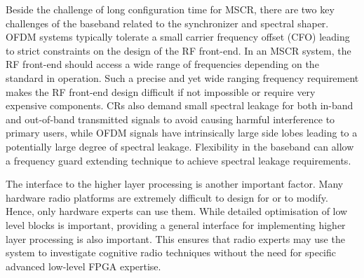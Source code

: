 Beside the challenge of long configuration time for MSCR, there are two key challenges of the baseband related to the synchronizer and spectral shaper. OFDM systems typically tolerate a small carrier frequency offset (CFO) leading to strict constraints on the design of the RF front-end. In an MSCR system, the RF front-end should access a wide range of frequencies depending on the standard in operation. Such a precise and yet wide ranging frequency requirement makes the RF front-end design difficult if not impossible or require very expensive components.
CRs also demand small spectral leakage for both in-band and out-of-band transmitted signals to avoid causing harmful interference to primary users, while OFDM signals have intrinsically large side lobes leading to a potentially large degree of spectral leakage. 
Flexibility in the baseband can allow a frequency guard extending technique to achieve spectral leakage requirements.

The interface to the higher layer processing is another important factor. Many hardware radio platforms are extremely difficult to design for or to modify. Hence, only hardware experts can use them. While detailed optimisation of low level blocks is important, providing a general interface for implementing higher layer processing is also important. This ensures that radio experts may use the system to investigate cognitive radio techniques without the need for specific advanced low-level FPGA expertise.

